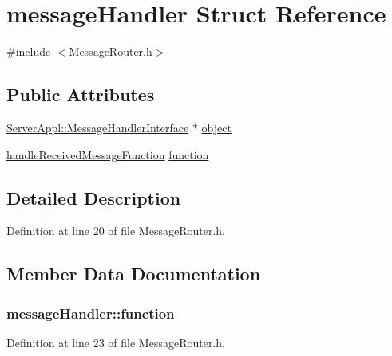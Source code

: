 \hypertarget{structmessage_handler}{}\section{message\+Handler Struct Reference}
\label{structmessage_handler}


{\ttfamily \#include $<$Message\+Router.\+h$>$}

\subsection*{Public Attributes}
\begin{DoxyCompactItemize}
\item 
\hyperlink{class_server_appl_1_1_message_handler_interface}{Server\+Appl\+::\+Message\+Handler\+Interface} $\ast$ \hyperlink{structmessage_handler_a19e36429d315bc4d38639035be25d257}{object}
\item 
\hyperlink{_message_router_8h_a7aaf0117cb85c9ee1867235806553ef4}{handle\+Received\+Message\+Function} \hyperlink{structmessage_handler_a962f666d1a2b8c3e31c0d5deee206ddd}{function}
\end{DoxyCompactItemize}


\subsection{Detailed Description}


Definition at line 20 of file Message\+Router.\+h.



\subsection{Member Data Documentation}
\hypertarget{structmessage_handler_a962f666d1a2b8c3e31c0d5deee206ddd}{}
\subsubsection[{function}]{ message\+Handler\+::function}\label{structmessage_handler_a962f666d1a2b8c3e31c0d5deee206ddd}


Definition at line 23 of file Message\+Router.\+h.

\hypertarget{structmessage_handler_a19e36429d315bc4d38639035be25d257}{}
